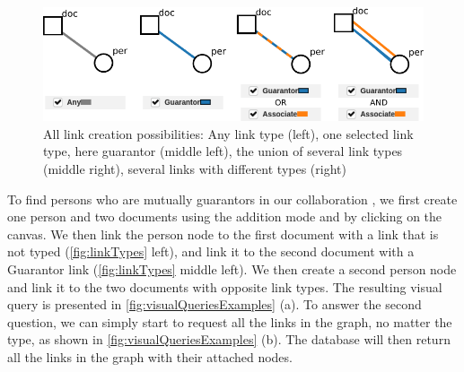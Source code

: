 \begin{figure}
    \centering
    \includegraphics[width=0.9\linewidth]{static/figures/ComBiNet/OriginalPaperFigures/CGF/links.pdf}
    \caption{All link creation possibilities: Any link type (left), one selected link type, here guarantor (middle left), the union of several link types (middle right), several links with different types (right)}\label{fig:linkTypes}
\end{figure}

To find persons who are mutually guarantors in our collaboration \pascal, we first create one person and two documents using the addition mode and by clicking on the canvas.
We then link the person node to the first document with a link that is not typed (\autoref{fig:linkTypes} left), and link it to the second document with a Guarantor link (\autoref{fig:linkTypes} middle left).
We then create a second person node and link it to the two documents with opposite link types.
The resulting visual query is presented in \autoref{fig:visualQueriesExamples} (a).
To answer the second question, we can simply start to request all the links in the graph, no matter the type, as shown in \autoref{fig:visualQueriesExamples} (b).
The database will then return all the links in the graph with their attached nodes.



